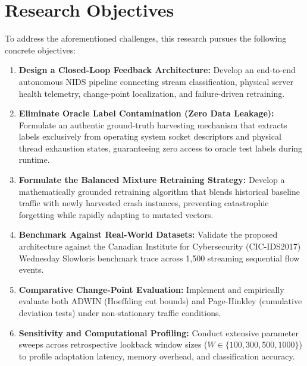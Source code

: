 \documentclass[12pt,a4paper,oneside]{report}
\begin{document}
\section{Research Objectives}
To address the aforementioned challenges, this research pursues the following concrete objectives:
\begin{enumerate}
    \item \textbf{Design a Closed-Loop Feedback Architecture:} Develop an end-to-end autonomous NIDS pipeline connecting stream classification, physical server health telemetry, change-point localization, and failure-driven retraining.
    \item \textbf{Eliminate Oracle Label Contamination (Zero Data Leakage):} Formulate an authentic ground-truth harvesting mechanism that extracts labels exclusively from operating system socket descriptors and physical thread exhaustion states, guaranteeing zero access to oracle test labels during runtime.
    \item \textbf{Formulate the Balanced Mixture Retraining Strategy:} Develop a mathematically grounded retraining algorithm that blends historical baseline traffic with newly harvested crash instances, preventing catastrophic forgetting while rapidly adapting to mutated vectors.
    \item \textbf{Benchmark Against Real-World Datasets:} Validate the proposed architecture against the Canadian Institute for Cybersecurity (CIC-IDS2017) Wednesday Slowloris benchmark trace across 1,500 streaming sequential flow events.
    \item \textbf{Comparative Change-Point Evaluation:} Implement and empirically evaluate both ADWIN (Hoeffding cut bounds) and Page-Hinkley (cumulative deviation tests) under non-stationary traffic conditions.
    \item \textbf{Sensitivity and Computational Profiling:} Conduct extensive parameter sweeps across retrospective lookback window sizes ($W \in \{100, 300, 500, 1000\}$) to profile adaptation latency, memory overhead, and classification accuracy.
\end{enumerate}
\end{document}
